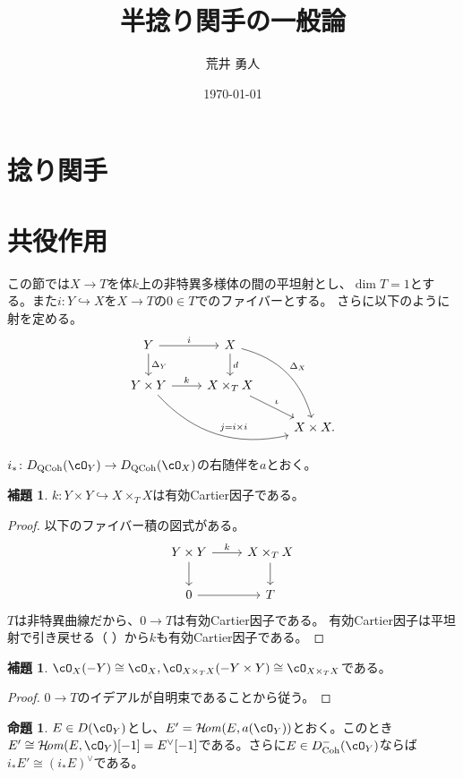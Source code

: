 \documentclass[uplatex, a4paper, dvipdfmx]{jsarticle}
\title{半捻り関手の一般論}
\author{荒井 勇人}
\date{\today}
\theoremstyle{definition}
\newtheorem{proposition}[theorem]{命題}
\newtheorem{lemma}[theorem]{補題}
\DeclareMathOperator{\CHom}{\mathcal{H}\!\mathit{om}}
\DeclareMathOperator{\Coh}{\mathrm{Coh}}
\DeclareMathOperator{\QCoh}{\mathrm{QCoh}}
\begin{document}
\maketitle

\section{捻り関手}
\section{共役作用}
この節では$X \to T$を体$k$上の非特異多様体の間の平坦射とし、$\dim T = 1$とする。また$i \colon Y \hookrightarrow X$を$X \to T$の$0 \in T$でのファイバーとする。
さらに以下のように射を定める。
\[
    \begin{tikzcd}
        Y \arrow[r,"i"]\arrow[d, "\Delta_Y"] & X \arrow[d,"d"]\arrow[rdd, bend left, "\Delta_X"]&\\
        Y \times Y \arrow[r, "k"]\arrow[rrd, bend right, "j=i \times i"]& X \times_T X\arrow[rd, "\iota"]&\\
        & & X \times X.
    \end{tikzcd}
\]
$i_* \colon D_{\QCoh}(\cO_Y) \to D_{\QCoh}(\cO_X)$の右随伴を$a$とおく。
\begin{lemma}
    $k \colon Y \times Y \hookrightarrow X \times_T X$は有効Cartier因子である。
\end{lemma}
\begin{proof}
    以下のファイバー積の図式がある。
    \[
        \begin{tikzcd}
            Y \times Y \arrow[r, "k"]\arrow[d] & X \times_T X \arrow[d]\\
            0 \arrow[r]& T
        \end{tikzcd}
    \]
    $T$は非特異曲線だから、$0 \to T$は有効Cartier因子である。
    有効Cartier因子は平坦射で引き戻せる（  {\cite[\href{https://stacks.math.columbia.edu/tag/02OO}{Tag 02OO}]{stacks-project}}）から$k$も有効Cartier因子である。
\end{proof}
\begin{lemma}
    $\cO_X(-Y) \cong \cO_X, \cO_{X \times_T X}(-Y\times Y) \cong \cO_{X \times_T X}$である。
\end{lemma}
\begin{proof}
    $0 \to T$のイデアルが自明束であることから従う。
\end{proof}
\begin{proposition}
    $E \in D(\cO_Y)$とし、$E' = \CHom(E, a(\cO_Y))$とおく。このとき$E'\cong \CHom(E, \cO_Y)[-1] = E^\vee[-1]$である。さらに$E \in D_{\Coh}^-(\cO_Y)$ならば$i_*E' \cong (i_*E)^\vee$である。
\end{proposition}
\end{document}
